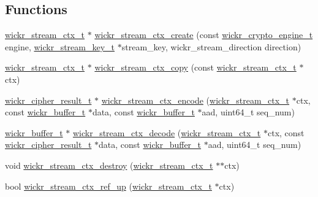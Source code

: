 \subsection*{Functions}
\begin{DoxyCompactItemize}
\item 
\hyperlink{structwickr__stream__ctx}{wickr\+\_\+stream\+\_\+ctx\+\_\+t} $\ast$ \hyperlink{group__wickr__stream_ga0b5c513a3e0958dc7fd4f8455206e32e}{wickr\+\_\+stream\+\_\+ctx\+\_\+create} (const \hyperlink{structwickr__crypto__engine}{wickr\+\_\+crypto\+\_\+engine\+\_\+t} engine, \hyperlink{structwickr__stream__key}{wickr\+\_\+stream\+\_\+key\+\_\+t} $\ast$stream\+\_\+key, wickr\+\_\+stream\+\_\+direction direction)
\item 
\hyperlink{structwickr__stream__ctx}{wickr\+\_\+stream\+\_\+ctx\+\_\+t} $\ast$ \hyperlink{group__wickr__stream_ga707b685e35eb437c33f5ec32c6760005}{wickr\+\_\+stream\+\_\+ctx\+\_\+copy} (const \hyperlink{structwickr__stream__ctx}{wickr\+\_\+stream\+\_\+ctx\+\_\+t} $\ast$ctx)
\item 
\hyperlink{structwickr__cipher__result}{wickr\+\_\+cipher\+\_\+result\+\_\+t} $\ast$ \hyperlink{group__wickr__stream_ga621a3ec801ab996b4fab1fe905c450bd}{wickr\+\_\+stream\+\_\+ctx\+\_\+encode} (\hyperlink{structwickr__stream__ctx}{wickr\+\_\+stream\+\_\+ctx\+\_\+t} $\ast$ctx, const \hyperlink{structwickr__buffer}{wickr\+\_\+buffer\+\_\+t} $\ast$data, const \hyperlink{structwickr__buffer}{wickr\+\_\+buffer\+\_\+t} $\ast$aad, uint64\+\_\+t seq\+\_\+num)
\item 
\hyperlink{structwickr__buffer}{wickr\+\_\+buffer\+\_\+t} $\ast$ \hyperlink{group__wickr__stream_gaa1eb323694f2c1652b51127b0b89138c}{wickr\+\_\+stream\+\_\+ctx\+\_\+decode} (\hyperlink{structwickr__stream__ctx}{wickr\+\_\+stream\+\_\+ctx\+\_\+t} $\ast$ctx, const \hyperlink{structwickr__cipher__result}{wickr\+\_\+cipher\+\_\+result\+\_\+t} $\ast$data, const \hyperlink{structwickr__buffer}{wickr\+\_\+buffer\+\_\+t} $\ast$aad, uint64\+\_\+t seq\+\_\+num)
\item 
void \hyperlink{group__wickr__stream_ga05260bfce1f50352cad32e0354c28a1d}{wickr\+\_\+stream\+\_\+ctx\+\_\+destroy} (\hyperlink{structwickr__stream__ctx}{wickr\+\_\+stream\+\_\+ctx\+\_\+t} $\ast$$\ast$ctx)
\item 
bool \hyperlink{group__wickr__stream_ga98121b9f8cdab6596cbd3bb0d99be6e3}{wickr\+\_\+stream\+\_\+ctx\+\_\+ref\+\_\+up} (\hyperlink{structwickr__stream__ctx}{wickr\+\_\+stream\+\_\+ctx\+\_\+t} $\ast$ctx)
\end{DoxyCompactItemize}


